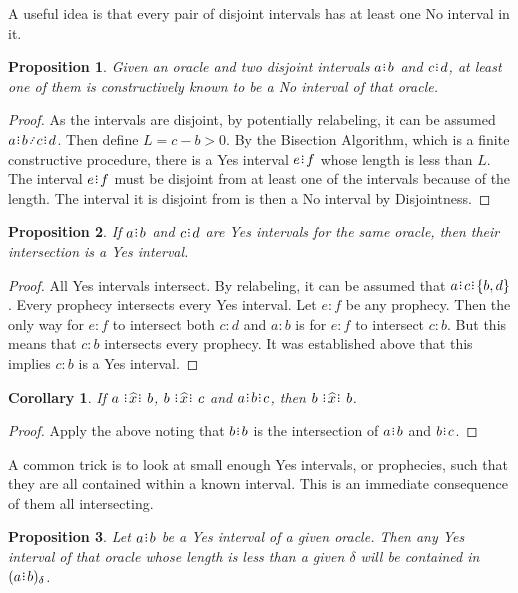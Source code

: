 \documentclass[12pt]{article}
\newtheorem{corollary}{Corollary}[section]
\newtheorem{proposition}{Proposition}[section]
\begin{document}
A useful idea is that every pair of disjoint intervals has at least one No interval in it. 

\begin{proposition}
    Given an oracle and two disjoint intervals $a\rint b$ and $c\rint d$, at least one of them is constructively known to be a No interval of that oracle. 
\end{proposition}

\begin{proof}
    As the intervals are disjoint, by potentially relabeling, it can be assumed $a\rint b \lte c\rint d$. Then define $L = c-b > 0$. By the Bisection Algorithm, which is a finite constructive procedure, there is a Yes interval $e\rint f$ whose length is less than $L$. The interval $e\rint f$ must be disjoint from at least one of the intervals because of the length. The interval it is disjoint from is then a No interval by Disjointness. 
\end{proof}

   
\begin{proposition}
    If $ a\rint b$ and $c\rint d$ are Yes intervals for the same oracle, then their intersection is a Yes interval. 
\end{proposition}

\begin{proof}
    All Yes intervals intersect. By relabeling, it can be assumed that $a \rint c \rint \{b, d\}$. Every prophecy intersects every Yes interval. Let $e:f$ be any prophecy. Then the only way for $e:f$ to intersect both $c:d$ and $a:b$ is for $e:f$ to intersect $c:b$.  But this means that $c:b$ intersects every prophecy. It was established above that this implies $c:b$ is a Yes interval. 
\end{proof}

\begin{corollary}
    If $a \xora b$, $b \xora c$ and $a\rint b\rint c$, then $b \xora b$.
\end{corollary}

\begin{proof}
    Apply the above noting that $b\rint b$ is the intersection of $a\rint b$ and $b\rint c$.
\end{proof}

A common trick is to look at small enough Yes intervals, or prophecies, such that they are all contained within a known interval. This is an immediate consequence of them all intersecting. 

\begin{proposition}\label{os-yescontain}
    Let $a\rint b$ be a Yes interval of a given oracle. Then any Yes interval of that oracle whose length is less than a given $\delta$ will be contained in $\halo{a\rint b}$.
\end{proposition}
\end{document}
